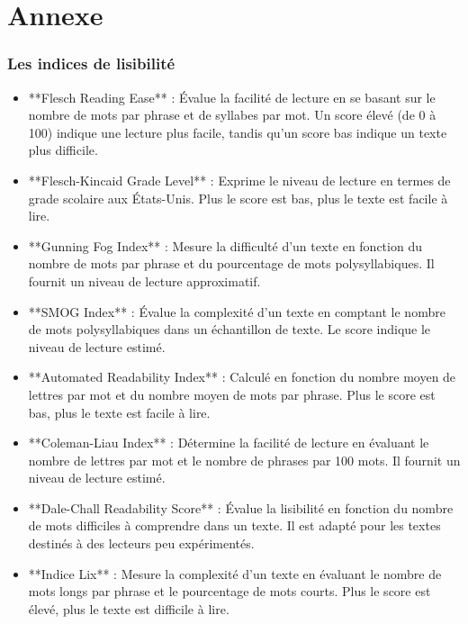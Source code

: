 \documentclass[12pt,a4paper,oneside,titlepage]{article} %
\begin{document}
	
	\pagebreak

	\section{Annexe}
	\subsubsection{Les indices de lisibilité}
\begin{itemize}
		
	\item **Flesch Reading Ease** : Évalue la facilité de lecture en se basant sur le nombre de mots par phrase et de syllabes par mot. Un score élevé (de 0 à 100) indique une lecture plus facile, tandis qu'un score bas indique un texte plus difficile.
	
	\item**Flesch-Kincaid Grade Level** : Exprime le niveau de lecture en termes de grade scolaire aux États-Unis. Plus le score est bas, plus le texte est facile à lire.
	
	\item **Gunning Fog Index** : Mesure la difficulté d'un texte en fonction du nombre de mots par phrase et du pourcentage de mots polysyllabiques. Il fournit un niveau de lecture approximatif.
	
	\item**SMOG Index** : Évalue la complexité d'un texte en comptant le nombre de mots polysyllabiques dans un échantillon de texte. Le score indique le niveau de lecture estimé.
	
	\item**Automated Readability Index** : Calculé en fonction du nombre moyen de lettres par mot et du nombre moyen de mots par phrase. Plus le score est bas, plus le texte est facile à lire.
	
	\item**Coleman-Liau Index** : Détermine la facilité de lecture en évaluant le nombre de lettres par mot et le nombre de phrases par 100 mots. Il fournit un niveau de lecture estimé.
	
	\item**Dale-Chall Readability Score** : Évalue la lisibilité en fonction du nombre de mots difficiles à comprendre dans un texte. Il est adapté pour les textes destinés à des lecteurs peu expérimentés.
	
	\item**Indice Lix** : Mesure la complexité d'un texte en évaluant le nombre de mots longs par phrase et le pourcentage de mots courts. Plus le score est élevé, plus le texte est difficile à lire.

\end{itemize}	
\end{document}
